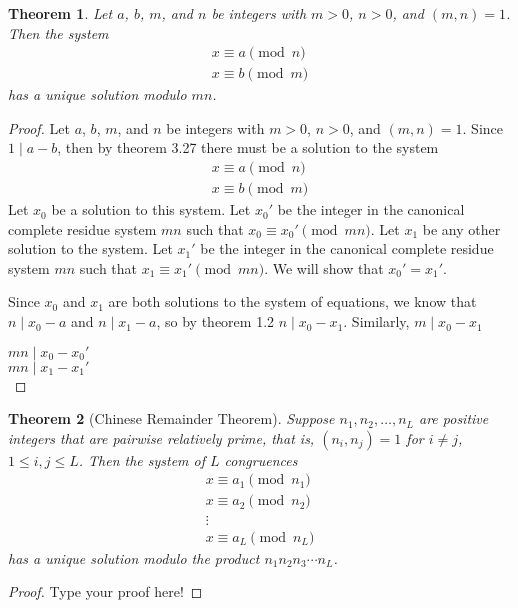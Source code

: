 \documentclass[12pt,leqno]{article}
\numberwithin{equation}{section}
\newtheorem{thm}{Theorem}[section]
\theoremstyle{definition}
\begin{document}
\begin{thm}
Let $a$, $b$, $m$, and $n$ be integers with $m > 0$, $n > 0$, and
$(m,n)=1$.  Then the system
\[ \begin{array}{l}
x \equiv a \pmod{n} \\
x \equiv b \pmod{m} \end{array} \] has a unique solution modulo
$mn$.
\end{thm}

\begin{proof}[Proof]
Let $a$, $b$, $m$, and $n$ be integers with $m > 0$, $n > 0$, and $(m,n)=1$.  Since $1 \mid a - b$, then by theorem 3.27 there must be a solution to the system
\[ \begin{array}{l}
x \equiv a \pmod{n} \\
x \equiv b \pmod{m} \end{array} \]
Let $x_0$ be a solution to this system.  Let $x_0'$ be the integer in the canonical complete residue system $mn$ such that $x_0 \equiv x_0' \pmod{mn}$. Let $x_1$ be any other solution to the system.  Let $x_1'$ be the integer in the canonical complete residue system $mn$ such that $x_1 \equiv x_1' \pmod{mn}$.  We will show that $x_0' = x_1'$.

Since $x_0$ and $x_1$ are both solutions to the system of equations, we know that $n \mid x_0 - a$ and $n \mid x_1 - a$, so by theorem 1.2 $n \mid x_0 - x_1$.  Similarly, $m \mid x_0 - x_1$


$mn \mid x_0 - x_0'$\\
$mn \mid x_1 - x_1'$\\

\end{proof}


\begin{thm}[Chinese Remainder Theorem]
Suppose $n_1, n_2, \hdots, n_L$ are positive integers that are
pairwise relatively prime, that is, $(n_i, n_j)=1$ for $i\neq j$,
$1\leq i, j \leq L$.  Then the system of $L$ congruences
\[ \begin{array}{c}
x \equiv a_1 \pmod{n_1} \\
x \equiv a_2 \pmod{n_2} \\
\vdots \\
x \equiv a_L \pmod{n_L} \end{array} \] has a unique solution modulo
the product $n_1 n_2  n_3 \cdots n_L$.
\end{thm}

\begin{proof}[Proof]
Type your proof here!
\end{proof}
\end{document}
